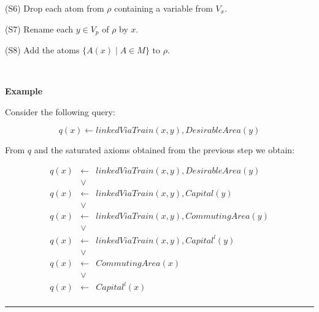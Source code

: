 \documentclass[oneside]{book}
\newcommand{\T}{\mathcal{T}}
\newcommand{\dlisa}{\sqsubseteq}
\begin{document}
(S6) Drop each atom from $\rho$ containing a variable from $V_x$.

(S7) Rename each $y \in V_p$ of $\rho$ by $x$.

(S8) Add the atoms $\{A(x) \mid A \in M \}$ to $\rho$.

\


	
	

\textbf{Example}

Consider the following query:

\[
q(x) \leftarrow linkedViaTrain(x,y),DesirableArea(y)
\]

From $q$ and the saturated axioms obtained from the previous step we obtain:

\[
\begin{array}{lll}
q(x) & \leftarrow & linkedViaTrain(x,y),DesirableArea(y) \\
& \vee & \\
q(x) & \leftarrow & linkedViaTrain(x,y),Capital(y) \\
& \vee & \\
q(x) & \leftarrow & linkedViaTrain(x,y),CommutingArea(y) \\
& \vee & \\
q(x) & \leftarrow & linkedViaTrain(x,y),Capital^l(y) \\
& \vee & \\
q(x) & \leftarrow & CommutingArea(x) \\
& \vee & \\
q(x) & \leftarrow & Capital^l(x) \\
\end{array}
\]
\hrule
\end{document}
